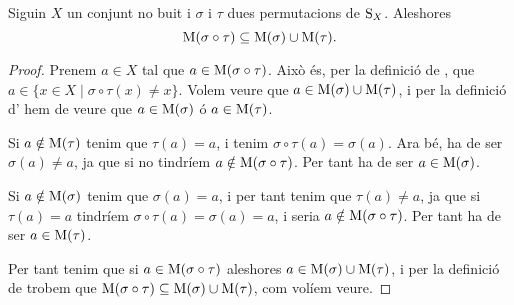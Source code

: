 \documentclass[../Apunts.tex]{subfiles}
\begin{document}
	\begin{proposition}
		\label{prop:Mou de la conjugació és unió dels Mous}
		Siguin \(X\) un conjunt no buit i \(\sigma\) i \(\tau\) dues permutacions de \(\operatorname{S}_{X}\). Aleshores
		\[\operatorname{M}(\sigma\circ\tau)\subseteq\operatorname{M}(\sigma)\cup\operatorname{M}(\tau).\]
		\begin{proof}
			Prenem \(a\in X\) tal que \(a\in\operatorname{M}(\sigma\circ\tau)\). Això és, per la definició de , que \(a\in\{x\in X\mid\sigma\circ\tau(x)\neq x\}\). Volem veure que \(a\in\operatorname{M}(\sigma)\cup\operatorname{M}(\tau)\), i per la definició d' hem de veure que \(a\in\operatorname{M}(\sigma)\) ó \(a\in\operatorname{M}(\tau)\).
			
			Si \(a\notin\operatorname{M}(\tau)\) tenim que \(\tau(a)=a\), i tenim \(\sigma\circ\tau(a)=\sigma(a)\). Ara bé, ha de ser \(\sigma(a)\neq a\), ja que si no tindríem \(a\notin\operatorname{M}(\sigma\circ\tau)\). Per tant ha de ser \(a\in\operatorname{M}(\sigma)\).
			
			Si \(a\notin\operatorname{M}(\sigma)\) tenim que \(\sigma(a)=a\), i per tant tenim que \(\tau(a)\neq a\), ja que si \(\tau(a)=a\) tindríem \(\sigma\circ\tau(a)=\sigma(a)=a\), i seria \(a\notin\operatorname{M}(\sigma\circ\tau)\). Per tant ha de ser \(a\in\operatorname{M}(\tau)\).
			
			Per tant tenim que si \(a\in\operatorname{M}(\sigma\circ\tau)\) aleshores \(a\in\operatorname{M}(\sigma)\cup\operatorname{M}(\tau)\), i per la definició de  trobem que \(\operatorname{M}(\sigma\circ\tau)\subseteq\operatorname{M}(\sigma)\cup\operatorname{M}(\tau)\), com volíem veure.
		\end{proof}
	\end{proposition}
\end{document}
